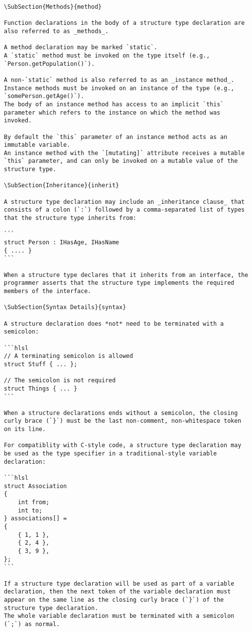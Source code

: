 \begin{verbatim}
\SubSection{Methods}{method}

Function declarations in the body of a structure type declaration are also referred to as _methods_.

A method declaration may be marked `static`.
A `static` method must be invoked on the type itself (e.g., `Person.getPopulation()`).

A non-`static` method is also referred to as an _instance method_.
Instance methods must be invoked on an instance of the type (e.g., `somePerson.getAge()`).
The body of an instance method has access to an implicit `this` parameter which refers to the instance on which the method was invoked.

By default the `this` parameter of an instance method acts as an immutable variable.
An instance method with the `[mutating]` attribute receives a mutable `this` parameter, and can only be invoked on a mutable value of the structure type.

\SubSection{Inheritance}{inherit}

A structure type declaration may include an _inheritance clause_ that consists of a colon (`:`) followed by a comma-separated list of types that the structure type inherits from:

```
struct Person : IHasAge, IHasName
{ .... }
```

When a structure type declares that it inherits from an interface, the programmer asserts that the structure type implements the required members of the interface.

\SubSection{Syntax Details}{syntax}

A structure declaration does *not* need to be terminated with a semicolon:

```hlsl
// A terminating semicolon is allowed
struct Stuff { ... };

// The semicolon is not required
struct Things { ... }
```

When a structure declarations ends without a semicolon, the closing curly brace (`}`) must be the last non-comment, non-whitespace token on its line.

For compatiblity with C-style code, a structure type declaration may be used as the type specifier in a traditional-style variable declaration:

```hlsl
struct Association
{
    int from;
    int to;
} associations[] =
{
    { 1, 1 },
    { 2, 4 },
    { 3, 9 },
};
```

If a structure type declaration will be used as part of a variable declaration, then the next token of the variable declaration must appear on the same line as the closing curly brace (`}`) of the structure type declaration.
The whole variable declaration must be terminated with a semicolon (`;`) as normal.



\end{verbatim}
